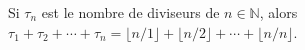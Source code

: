 Si $\tau_n$ est le nombre de diviseurs de $n \in \mathbb{N}$, alors $\tau_1 + \tau_2 + \cdots + \tau_n = \lfloor n/1 \rfloor + \lfloor n/2 \rfloor + \cdots + \lfloor n/n \rfloor$.
